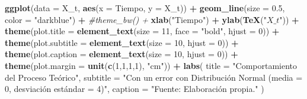 \documentclass[
]{book}
\newenvironment{Shaded}{\begin{snugshade}}{\end{snugshade}}
\newcommand{\AttributeTok}[1]{\textcolor[rgb]{0.13,0.29,0.53}{#1}}
\newcommand{\CommentTok}[1]{\textcolor[rgb]{0.56,0.35,0.01}{\textit{#1}}}
\newcommand{\DecValTok}[1]{\textcolor[rgb]{0.00,0.00,0.81}{#1}}
\newcommand{\FloatTok}[1]{\textcolor[rgb]{0.00,0.00,0.81}{#1}}
\newcommand{\FunctionTok}[1]{\textcolor[rgb]{0.13,0.29,0.53}{\textbf{#1}}}
\newcommand{\NormalTok}[1]{#1}
\newcommand{\SpecialCharTok}[1]{\textcolor[rgb]{0.81,0.36,0.00}{\textbf{#1}}}
\newcommand{\StringTok}[1]{\textcolor[rgb]{0.31,0.60,0.02}{#1}}
\begin{document}
\begin{Shaded}
\begin{Highlighting}[]
\FunctionTok{ggplot}\NormalTok{(}\AttributeTok{data =}\NormalTok{ X\_t, }\FunctionTok{aes}\NormalTok{(}\AttributeTok{x =}\NormalTok{ Tiempo, }\AttributeTok{y =}\NormalTok{ X\_t)) }\SpecialCharTok{+} 
  \FunctionTok{geom\_line}\NormalTok{(}\AttributeTok{size =} \FloatTok{0.5}\NormalTok{, }\AttributeTok{color =} \StringTok{"darkblue"}\NormalTok{) }\SpecialCharTok{+}
  \CommentTok{\#theme\_bw() + }
  \FunctionTok{xlab}\NormalTok{(}\StringTok{"Tiempo"}\NormalTok{) }\SpecialCharTok{+} 
  \FunctionTok{ylab}\NormalTok{(}\FunctionTok{TeX}\NormalTok{(}\StringTok{"$X\_t$"}\NormalTok{)) }\SpecialCharTok{+} 
  \FunctionTok{theme}\NormalTok{(}\AttributeTok{plot.title =} \FunctionTok{element\_text}\NormalTok{(}\AttributeTok{size =} \DecValTok{11}\NormalTok{, }\AttributeTok{face =} \StringTok{"bold"}\NormalTok{, }
                                  \AttributeTok{hjust =} \DecValTok{0}\NormalTok{)) }\SpecialCharTok{+} 
  \FunctionTok{theme}\NormalTok{(}\AttributeTok{plot.subtitle =} \FunctionTok{element\_text}\NormalTok{(}\AttributeTok{size =} \DecValTok{10}\NormalTok{, }\AttributeTok{hjust =} \DecValTok{0}\NormalTok{)) }\SpecialCharTok{+} 
  \FunctionTok{theme}\NormalTok{(}\AttributeTok{plot.caption =} \FunctionTok{element\_text}\NormalTok{(}\AttributeTok{size =} \DecValTok{10}\NormalTok{, }\AttributeTok{hjust =} \DecValTok{0}\NormalTok{)) }\SpecialCharTok{+}
  \FunctionTok{theme}\NormalTok{(}\AttributeTok{plot.margin =} \FunctionTok{unit}\NormalTok{(}\FunctionTok{c}\NormalTok{(}\DecValTok{1}\NormalTok{,}\DecValTok{1}\NormalTok{,}\DecValTok{1}\NormalTok{,}\DecValTok{1}\NormalTok{), }\StringTok{"cm"}\NormalTok{)) }\SpecialCharTok{+}
  \FunctionTok{labs}\NormalTok{(}
    \AttributeTok{title =} \StringTok{"Comportamiento del Proceso Teórico"}\NormalTok{,}
    \AttributeTok{subtitle =} \StringTok{"Con un error con Distribución Normal (media = 0, desviación estándar = 4)"}\NormalTok{,}
    \AttributeTok{caption =} \StringTok{"Fuente: Elaboración propia."}
\NormalTok{  )}
\end{Highlighting}
\end{Shaded}
\end{document}
